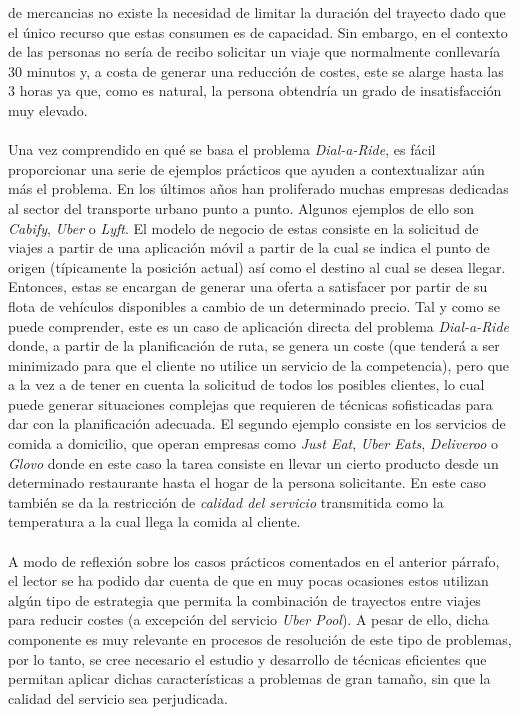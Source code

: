 \documentclass{subfiles}
\begin{document}
de mercancias no existe la necesidad de limitar la duración del trayecto dado que el único recurso que estas consumen es de capacidad. Sin embargo, en el contexto de las personas no sería de recibo solicitar un viaje que normalmente conllevaría $30$ minutos y, a costa de generar una reducción de costes, este se alarge hasta las $3$ horas ya que, como es natural, la persona obtendría un grado de insatisfacción muy elevado.

      \paragraph{}
      Una vez comprendido en qué se basa el problema \emph{Dial-a-Ride}, es fácil proporcionar una serie de ejemplos prácticos que ayuden a contextualizar aún más el problema. En los últimos años han proliferado muchas empresas dedicadas al sector del transporte urbano punto a punto. Algunos ejemplos de ello son \emph{Cabify}, \emph{Uber} o \emph{Lyft}. El modelo de negocio de estas consiste en la solicitud de viajes a partir de una aplicación móvil a partir de la cual se indica el punto de origen (típicamente la posición actual) así como el destino al cual se desea llegar. Entonces, estas se encargan de generar una oferta a satisfacer por partir de su flota de vehículos disponibles a cambio de un determinado precio. Tal y como se puede comprender, este es un caso de aplicación directa del problema \emph{Dial-a-Ride} donde, a partir de la planificación de ruta, se genera un coste (que tenderá a ser minimizado para que el cliente no utilice un servicio de la competencia), pero que a la vez a de tener en cuenta la solicitud de todos los posibles clientes, lo cual puede generar situaciones complejas que requieren de técnicas sofisticadas para dar con la planificación adecuada. El segundo ejemplo consiste en los servicios de comida a domicilio, que operan empresas como \emph{Just Eat}, \emph{Uber Eats}, \emph{Deliveroo} o \emph{Glovo} donde en este caso la tarea consiste en llevar un cierto producto desde un determinado restaurante hasta el hogar de la persona solicitante. En este caso también se da la restricción de \emph{calidad del servicio} transmitida como la temperatura a la cual llega la comida al cliente.

      \paragraph{}
      A modo de reflexión sobre los casos prácticos comentados en el anterior párrafo, el lector se ha podido dar cuenta de que en muy pocas ocasiones estos utilizan algún tipo de estrategia que permita la combinación de trayectos entre viajes para reducir costes (a excepción del servicio \emph{Uber Pool}). A pesar de ello, dicha componente es muy relevante en procesos de resolución de este tipo de problemas, por lo tanto, se cree necesario el estudio y desarrollo de técnicas eficientes que permitan aplicar dichas características a problemas de gran tamaño, sin que la calidad del servicio sea perjudicada.
\end{document}
